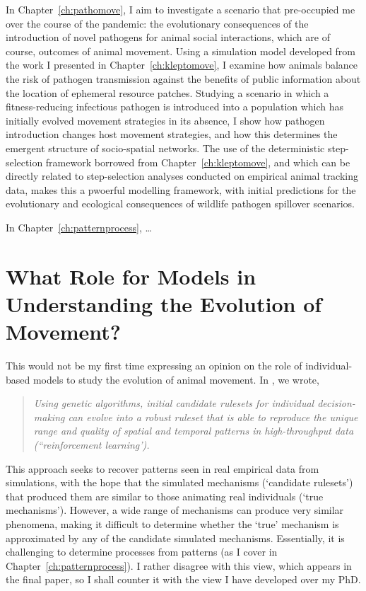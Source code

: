 In Chapter~\ref{ch:pathomove}, I aim to investigate a scenario that pre-occupied me over the course of the pandemic: the evolutionary consequences of the introduction of novel pathogens for animal social interactions, which are of course, outcomes of animal movement.
Using a simulation model developed from the work I presented in Chapter~\ref{ch:kleptomove}, I examine how animals balance the risk of pathogen transmission against the benefits of public information about the location of ephemeral resource patches.
Studying a scenario in which a fitness-reducing infectious pathogen is introduced into a population which has initially evolved movement strategies in its absence, I show how pathogen introduction changes host movement strategies, and how this determines the emergent structure of socio-spatial networks.
The use of the deterministic step-selection framework borrowed from Chapter~\ref{ch:kleptomove}, and which can be directly related to step-selection analyses conducted on empirical animal tracking data, makes this a pwoerful modelling framework, with initial predictions for the evolutionary and ecological consequences of wildlife pathogen spillover scenarios.

In Chapter~\ref{ch:patternprocess}, \ldots

\section*{What Role for Models in Understanding the Evolution of Movement?}

This would not be my first time expressing an opinion on the role of individual-based models to study the evolution of animal movement.
In \textcite{nathan2022}, we wrote,
\begin{quotation}
    \emph{
        Using genetic algorithms, initial candidate rulesets for individual decision-making can evolve into a robust ruleset that is able to reproduce the unique range and quality of spatial and temporal patterns in high-throughput data (``reinforcement learning').
    }
\end{quotation}
This approach seeks to recover patterns seen in real empirical data from simulations, with the hope that the simulated mechanisms (`candidate rulesets') that produced them are similar to those animating real individuals (`true mechanisms').
However, a wide range of mechanisms can produce very similar phenomena, making it difficult to determine whether the `true' mechanism is approximated by any of the candidate simulated mechanisms.
Essentially, it is challenging to determine processes from patterns (as I cover in Chapter~\ref{ch:patternprocess}).
I rather disagree with this view, which appears in the final paper, so I shall counter it with the view I have developed over my PhD.

